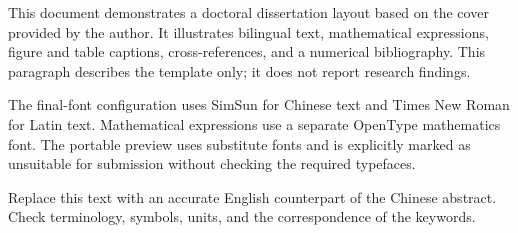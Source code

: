 This document demonstrates a doctoral dissertation layout based on the cover
provided by the author. It illustrates bilingual text, mathematical expressions,
figure and table captions, cross-references, and a numerical bibliography.
This paragraph describes the template only; it does not report research findings.

The final-font configuration uses SimSun for Chinese text and Times New Roman
for Latin text. Mathematical expressions use a separate OpenType mathematics
font. The portable preview uses substitute fonts and is explicitly marked as
unsuitable for submission without checking the required typefaces.

Replace this text with an accurate English counterpart of the Chinese abstract.
Check terminology, symbols, units, and the correspondence of the keywords.
